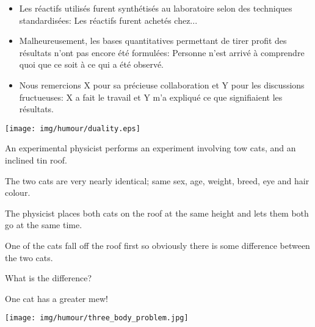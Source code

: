 \begin{itemize}
	\item  Les réactifs utilisés furent synthétisés au laboratoire selon des techniques standardisées: Les réactifs furent achetés chez...

	\item  Malheureusement, les bases quantitatives permettant de tirer profit des résultats n'ont pas encore été formulées: Personne n'est arrivé à comprendre quoi que ce soit à ce qui a été observé.

	\item  Nous remercions X pour sa précieuse collaboration et Y pour les discussions fructueuses: X a fait le travail et Y m'a expliqué ce que signifiaient les résultats.
\end{itemize}

	\begin{center}\underline{\hspace{5 cm}}\end{center}

	\begin{center}
	\texttt{[image: img/humour/duality.eps]}
	\end{center}
	
	\begin{center}\underline{\hspace{5 cm}}\end{center}
	An experimental physicist performs an experiment involving tow cats, and an inclined tin roof.
	
	The two cats are very nearly identical; same sex, age, weight, breed, eye and hair colour.
	
	The physicist places both cats on the roof at the same height and lets them both go at the same time.
	
	One of the cats fall off the roof first so obviously there is some difference between the two cats.
	
	What is the difference?
	
	One cat has a greater mew!
	
	\begin{center}\underline{\hspace{5 cm}}\end{center}
	
	\begin{center}
	\texttt{[image: img/humour/three\_body\_problem.jpg]}
	\end{center}
	
	\begin{center}\underline{\hspace{5 cm}}\end{center}
	
